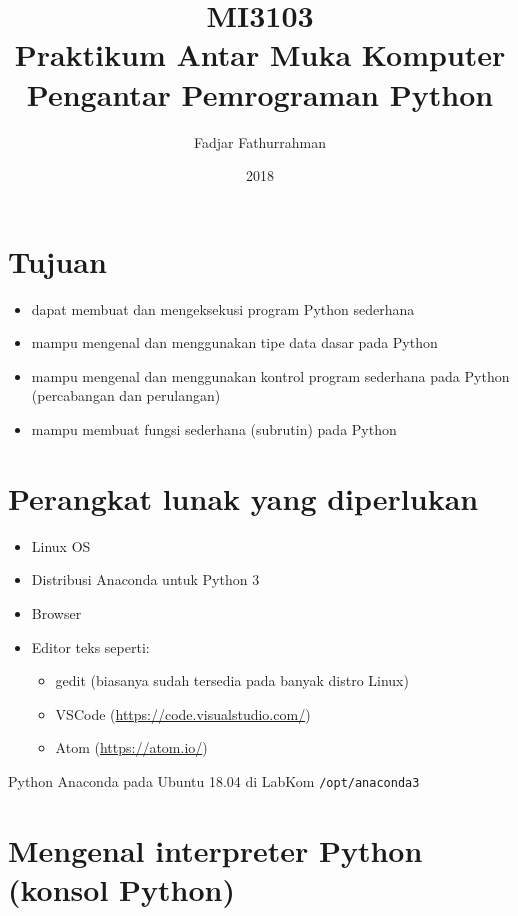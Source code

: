 \documentclass[a4paper,11pt]{extarticle}
\title{
MI3103 \\
Praktikum Antar Muka Komputer\\
Pengantar Pemrograman Python}
\author{Fadjar Fathurrahman}
\date{2018}
\begin{document}
\maketitle

\section{Tujuan}
\begin{itemize}
\item dapat membuat dan mengeksekusi program Python sederhana
\item mampu mengenal dan menggunakan tipe data dasar pada Python
\item mampu mengenal dan menggunakan kontrol program sederhana pada Python (percabangan dan
perulangan)
\item mampu membuat fungsi sederhana (subrutin) pada Python
\end{itemize}

\section{Perangkat lunak yang diperlukan}
\begin{itemize}
\item Linux OS
\item Distribusi Anaconda untuk Python 3
\item Browser
\item Editor teks seperti:
  \begin{itemize}
  \item \textsf{gedit} (biasanya sudah tersedia pada banyak distro Linux)
  \item \textsf{VSCode} (\url{https://code.visualstudio.com/})
  \item \textsf{Atom} (\url{https://atom.io/})
  \end{itemize}
\end{itemize}


Python Anaconda pada Ubuntu 18.04 di LabKom
\texttt{/opt/anaconda3}

\section{Mengenal interpreter Python (konsol Python)}
\end{document}
